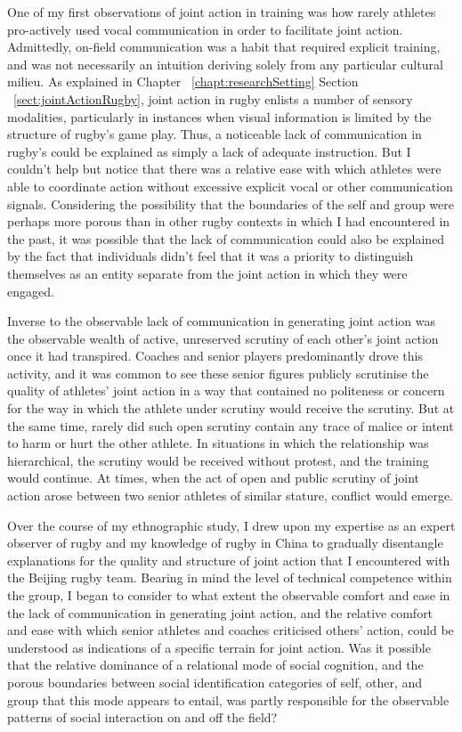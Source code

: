 \begin{CJK}{UTF8}{gbsn}
One of my first observations of joint action in training was how rarely athletes pro-actively used vocal communication in order to facilitate joint action.  Admittedly, on-field communication was a habit that required explicit training, and was not necessarily an intuition deriving solely from any particular cultural milieu.  As explained in Chapter ~\ref{chapt:researchSetting} Section ~\ref{sect:jointActionRugby}, joint action in rugby enlists a number of sensory modalities, particularly in instances when visual information is limited by the structure of rugby's game play.  Thus, a noticeable lack of communication in rugby's could be explained as simply a lack of adequate instruction.  But I couldn't help but notice that there was a relative ease with which athletes were able to coordinate action without excessive explicit vocal or other communication signals.  Considering the possibility that the boundaries of the self and group were perhaps more porous than in other rugby contexts in which I had encountered in the past, it was possible that the lack of communication could also be explained by the fact that individuals didn't feel that it was a priority to distinguish themselves as an entity separate from the joint action in which they were engaged.

Inverse to the observable lack of communication in generating joint action was the observable wealth of active, unreserved scrutiny of each other's joint action once it had transpired.  Coaches and senior players predominantly drove this activity, and it was common to see these senior figures publicly scrutinise the quality of athletes' joint action in a way that contained no politeness or concern for the way in which the athlete under scrutiny would receive the scrutiny. But at the same time, rarely did such open scrutiny contain any trace of malice or intent to harm or hurt the other athlete. In situations in which the relationship was hierarchical, the scrutiny would be received without protest, and the training would continue.   At times, when the act of open and public scrutiny of joint action arose between two senior athletes of similar stature, conflict would emerge.

Over the course of my ethnographic study, I drew upon my expertise as an expert observer of rugby and my knowledge of rugby in China to  gradually disentangle explanations for the quality and structure of joint action that I encountered with the Beijing rugby team. Bearing in mind the level of technical competence within the group, I began to consider to what extent the observable comfort and ease in the lack of communication in generating joint action, and the relative comfort and ease with which senior athletes and coaches criticised others' action, could be understood as indications of a specific terrain for joint action.  Was it possible that the relative dominance of a relational mode of social cognition, and the porous boundaries between social identification categories of self, other, and group that this mode appears to entail, was partly responsible for the observable patterns of social interaction on and off the field?


\end{CJK}
